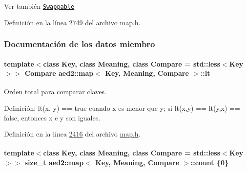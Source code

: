 \begin{DoxySeeAlso}{Ver también}
\href{http://en.cppreference.com/w/cpp/concept/Swappable}{\tt Swappable} 
\end{DoxySeeAlso}


Definición en la línea \hyperlink{map_8h_source_l02749}{2749} del archivo \hyperlink{map_8h_source}{map.\+h}.



\subsubsection{Documentación de los datos miembro}
\paragraph[{\texorpdfstring{lt}{lt}}]{\setlength{\rightskip}{0pt plus 5cm}template$<$class Key, class Meaning, class Compare = std\+::less$<$\+Key$>$$>$ Compare {\bf aed2\+::map}$<$ Key, Meaning, Compare $>$\+::lt\hspace{0.3cm}{\ttfamily [private]}}\hypertarget{classaed2_1_1map_a0e5be36fae0693e4665bd2a615e7550a_a0e5be36fae0693e4665bd2a615e7550a}{}\label{classaed2_1_1map_a0e5be36fae0693e4665bd2a615e7550a_a0e5be36fae0693e4665bd2a615e7550a}


Orden total para comparar claves. 

Definición\+: lt(x, y) == true cuando x es menor que y; si lt(x,y) == lt(y,x) == false, entonces x e y son iguales. 

Definición en la línea \hyperlink{map_8h_source_l02416}{2416} del archivo \hyperlink{map_8h_source}{map.\+h}.

\paragraph[{\texorpdfstring{count}{count}}]{\setlength{\rightskip}{0pt plus 5cm}template$<$class Key, class Meaning, class Compare = std\+::less$<$\+Key$>$$>$ size\+\_\+t {\bf aed2\+::map}$<$ Key, Meaning, Compare $>$\+::count \{0\}\hspace{0.3cm}{\ttfamily [private]}}\hypertarget{classaed2_1_1map_a44236c4f16cdc20a10759862b198bde4_a44236c4f16cdc20a10759862b198bde4}{}\label{classaed2_1_1map_a44236c4f16cdc20a10759862b198bde4_a44236c4f16cdc20a10759862b198bde4}


